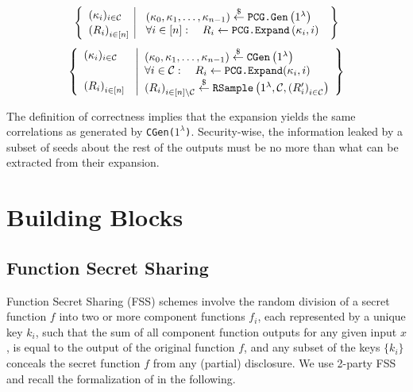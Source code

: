 \begin{definition}
\begin{itemize}
        $$
        \left\{\begin{array}{l|l}
        (\kappa_i)_{i\in\mathcal{C}} & \begin{array}{l}
        \left(\kappa_0, \kappa_1, \ldots, \kappa_{n-1}\right) \stackrel{\$}{\leftarrow} \texttt{\textup{PCG.Gen}}\left(1^\lambda\right) \\
        \end{array} \\
        \left(R_i\right)_{i \in[n]} & \begin{array}{l}
        \forall i \in[n]: \quad R_i \leftarrow \texttt{\textup{PCG.Expand}}\left(\kappa_i, i\right)
        \end{array}
        \end{array}\right\}
        $$
        $$
        \left\{\begin{array}{l}
        (\kappa_i)_{i\in\mathcal{C}} \\\\
        \left(R_i\right)_{i \in[n]} \vphantom{\stackrel{\$}{\leftarrow}}
        \end{array}\right.
        \left|\begin{array}{l}
        \left(\kappa_0, \kappa_1, \ldots, \kappa_{n-1}\right) \stackrel{\$}{\leftarrow} \texttt{\textup{CGen}}\left(1^\lambda\right) \\
        \forall i \in \mathcal{C}: \quad R_i \leftarrow \texttt{\textup{PCG.Expand}}(\kappa_i, i) \\
        \left(R_i\right)_{i \in [n]\setminus\mathcal{C}} \stackrel{\$}{\leftarrow} \texttt{\textup{RSample}}\left(1^\lambda, \mathcal{C},\left(R_i^{\prime}\right)_{i \in \mathcal{C}}\right)
        \end{array}\right\}
        $$
    \end{itemize} 
\end{definition}

The definition of correctness implies that the expansion yields the same correlations as generated by \texttt{\textup{CGen($1^\lambda$)}}. Security-wise, the information leaked by a subset of seeds about the rest of the outputs must be no more than what can be extracted from their expansion.


\section{Building Blocks}
\subsection{Function Secret Sharing}
\label{prelim:FSS}
Function Secret Sharing \cite{boyle2015function} (FSS) schemes involve the random division of a secret function \(f\) into two or more component functions \(f_i\), each represented by a unique key \(k_i\), such that the sum of all component function outputs for any given input \(x\), is equal to the output of the original function \(f\), and any subset of the keys \(\{k_i\}\) conceals the secret function \(f\) from any (partial) disclosure. We use 2-party FSS and recall the formalization of \cite{boyle2020efficient} in the following.

